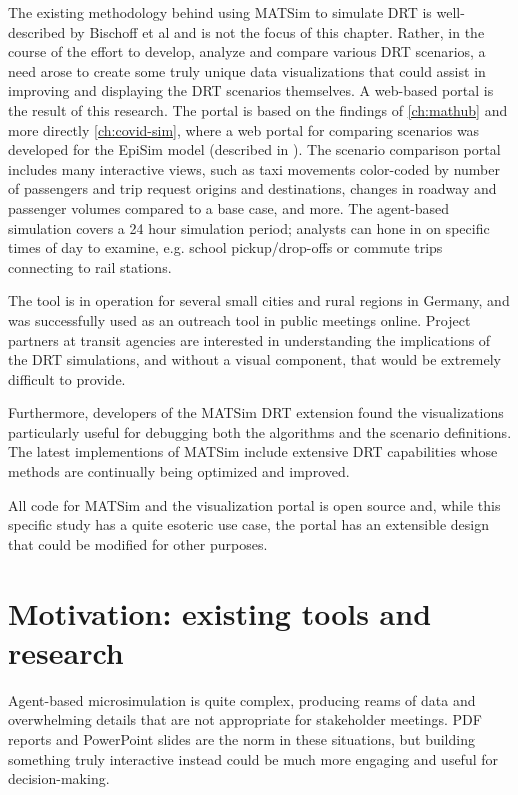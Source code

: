 The existing methodology behind using MATSim to simulate DRT is well-described by Bischoff et al \cite{BischoffMaciejewskiNagel2017SharedTaxiIITSC} and is not the focus of this chapter. Rather, in the course of the effort to develop, analyze and compare various DRT scenarios, a need arose to create some truly unique data visualizations that could assist in improving and displaying the DRT scenarios themselves. A web-based portal is the result of this research. The portal is based on the findings of \autoref{ch:mathub} and more directly \autoref{ch:covid-sim}, where a web portal for comparing scenarios was developed for the EpiSim model (described in \cite{MuellerEtAl2021episim}). The scenario comparison portal includes many interactive views, such as taxi movements color-coded by number of passengers and trip request origins and destinations, changes in roadway and passenger volumes compared to a base case, and more. The agent-based simulation covers a 24 hour simulation period; analysts can hone in on specific times of day to examine, e.g. school pickup/drop-offs or commute trips connecting to rail stations.

The tool is in operation for several small cities and rural regions in Germany, and was successfully used as an outreach tool in public meetings online. Project partners at transit agencies are interested in understanding the implications of the DRT simulations, and without a visual component, that would be extremely difficult to provide.

Furthermore, developers of the MATSim DRT extension found the visualizations particularly useful for debugging both the algorithms and the scenario definitions. The latest implementions of MATSim include extensive DRT capabilities whose methods are continually being optimized and improved.

All code for MATSim and the visualization portal is open source and, while this specific study has a quite esoteric use case, the portal has an extensible design that could be modified for other purposes.

\section{Motivation: existing tools and research}
\label{avov-motivation}

Agent-based microsimulation is quite complex, producing reams of data and overwhelming details that are not appropriate for stakeholder meetings. PDF reports and PowerPoint slides are the norm in these situations, but building something truly interactive instead could be much more engaging and useful for decision-making.


